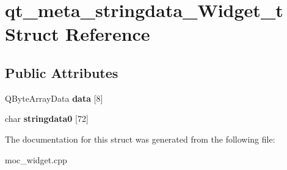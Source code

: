 \hypertarget{structqt__meta__stringdata__Widget__t}{\section{qt\-\_\-meta\-\_\-stringdata\-\_\-\-Widget\-\_\-t Struct Reference}
\label{structqt__meta__stringdata__Widget__t}
}
\subsection*{Public Attributes}
\begin{DoxyCompactItemize}
\item 
\hypertarget{structqt__meta__stringdata__Widget__t_aa12dab415e0beb2f05cbf0528257e748}{Q\-Byte\-Array\-Data {\bfseries data} \mbox{[}8\mbox{]}}\label{structqt__meta__stringdata__Widget__t_aa12dab415e0beb2f05cbf0528257e748}

\item 
\hypertarget{structqt__meta__stringdata__Widget__t_ada88879adfccc3cda0f118440f84f73f}{char {\bfseries stringdata0} \mbox{[}72\mbox{]}}\label{structqt__meta__stringdata__Widget__t_ada88879adfccc3cda0f118440f84f73f}

\end{DoxyCompactItemize}


The documentation for this struct was generated from the following file\-:\begin{DoxyCompactItemize}
\item 
moc\-\_\-widget.\-cpp\end{DoxyCompactItemize}
